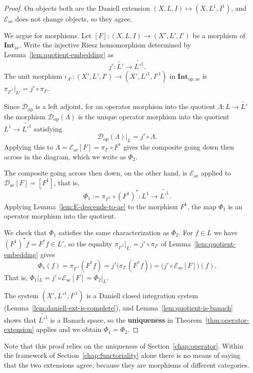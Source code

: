 \begin{proof}
  On objects both are the Daniell extension
  $(X,L,I)\mapsto(X,L^1,I^1)$, and $\mathcal{E}_{\mathrm{ae}}$ does not change
  objects, so they agree.

  We argue for morphisms. Let $[F]:(X,L,I)\to(X',L',I')$ be a morphism of
  $\mathbf{Int}_{\mathrm{ae}}$.
  Write the injective Riesz homomorphism determined by
  Lemma~\ref{lem:quotient-embedding} as
  \[
    j':\widetilde{L'}\longrightarrow\widetilde{L'^1} .
  \]
  The unit morphism
  $i_{A'}:(X',L',I')\to(X',L'^1,I'^1)$ in
  $\mathbf{Int}_{\mathrm{op},\mathrm{ae}}$ is
  $\pi_{I'^1}|_{L'}=j'\circ\pi_{I'}$.

  Since $\mathcal{D}_{\mathrm{op}}$ is a left adjoint, for an operator morphism
  into the quotient $\Lambda:L\to\widetilde{L'}$ the morphism
  $\mathcal{D}_{\mathrm{op}}(\Lambda)$ is the unique operator morphism into the
  quotient $L^1\to\widetilde{L'^1}$ satisfying
  \[
    \mathcal{D}_{\mathrm{op}}(\Lambda)\bigr|_{L}=j'\circ\Lambda .
  \]
  Applying this to
  $\Lambda=\mathcal{E}_{\mathrm{ae}}[F]=\pi_{I'}\circ F^*$ gives the composite
  going down then across in the diagram, which we write as $\Phi_2$.

  The composite going across then down, on the other hand, is
  $\mathcal{E}_{\mathrm{ae}}$ applied to
  $\mathcal{D}_{\mathrm{ae}}[F]=[F^1]$, that is,
  \[
    \Phi_1:=\pi_{I'^1}\circ(F^1)^*:L^1\to\widetilde{L'^1} .
  \]
  Applying Lemma~\ref{lem:E-descends-to-ae} to the morphism $F^1$, the map
  $\Phi_1$ is an operator morphism into the quotient.

  We check that $\Phi_1$ satisfies the same characterization as $\Phi_2$.
  For $f\in L$ we have $(F^1)^*f=F^*f\in L'$, so the equality
  $\pi_{I'^1}|_{L'}=j'\circ\pi_{I'}$ of
  Lemma~\ref{lem:quotient-embedding} gives
  \[
    \Phi_1(f)
    =\pi_{I'^1}(F^*f)
    =j'\bigl(\pi_{I'}(F^*f)\bigr)
    =\bigl(j'\circ\mathcal{E}_{\mathrm{ae}}[F]\bigr)(f) .
  \]
  That is, $\Phi_1|_L=j'\circ\mathcal{E}_{\mathrm{ae}}[F]=\Phi_2|_L$.

  The system $(X',L'^1,I'^1)$ is a Daniell closed integration system
  (Lemma~\ref{lem:daniell-ext-is-complete}), and
  Lemma~\ref{lem:quotient-is-banach} shows that $\widetilde{L'^1}$ is a Banach
  space, so the \textbf{uniqueness} in
  Theorem~\ref{thm:operator-extension} applies and we obtain
  $\Phi_1=\Phi_2$.
\end{proof}

\begin{remark}
  Note that this proof relies on the uniqueness of
  Section~\ref{chap:operator}.
  Within the framework of Section~\ref{chap:functoriality} alone there is no
  means of saying that the two extensions agree, because they are morphisms of
  different categories.
\end{remark}


